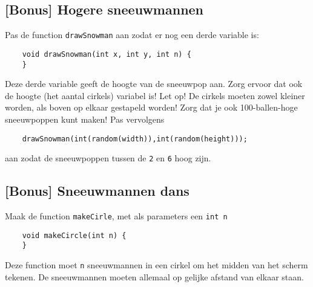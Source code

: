 \subsection{[Bonus] Hogere sneeuwmannen}
Pas de function \texttt{drawSnowman} aan zodat er nog een derde variable is:
\begin{lstlisting}
    void drawSnowman(int x, int y, int n) {
    }
\end{lstlisting}
Deze derde variable geeft de hoogte van de sneeuwpop aan. Zorg ervoor dat ook de hoogte (het aantal cirkels) variabel is! Let op! De cirkels moeten zowel kleiner worden, als boven op elkaar gestapeld worden! Zorg dat je ook 100-ballen-hoge sneeuwpoppen kunt maken! Pas vervolgens 
\begin{lstlisting}
    drawSnowman(int(random(width)),int(random(height)));
\end{lstlisting}
aan zodat de sneeuwpoppen tussen de \texttt{2} en \texttt{6} hoog zijn.
\subsection{[Bonus] Sneeuwmannen dans}
Maak de function \texttt{makeCirle}, met als parameters een \texttt{int n}
\begin{lstlisting}
    void makeCircle(int n) {
    }
\end{lstlisting}
Deze function moet \texttt{n} sneeuwmannen in een cirkel om het midden van het scherm tekenen. De sneeuwmannen moeten allemaal op gelijke afstand van elkaar staan.



